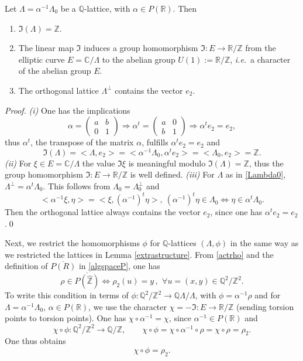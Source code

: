 \documentclass[graybox, envcountsect%
]{svmult}
\def\C{{\mathbb C}}
\def\Q{{\mathbb Q}}
\def\R{{\mathbb R}}
\def\Z{{\mathbb Z}}
\def\qqq{\,,\,~\forall}
\newcommand{\ie}{{\it i.e.\/}\ }
\begin{document}
 
\begin{lemma}\label{extrastructure} Let $\Lambda=\alpha^{-1}\Lambda_0$ be a $\Q$-lattice, with $\alpha\in P(\R)$. Then
 \begin{enumerate}
\item[(i)] $\Im(\Lambda)=\Z$. 
\item[(ii)] The linear map $\Im$ induces a group homomorphism $\Im:E\to \R/\Z$ from the elliptic curve 
$E=\C/\Lambda$ to the abelian group $U(1):=\R/\Z$, \ie a character  of the abelian group $E$.
\item[(iii)] The orthogonal lattice $\Lambda^\perp$ contains the vector $e_2$.
\end{enumerate}
\end{lemma}
\begin{proof} {\it (i)} One has the implications
$$
\alpha=\begin{pmatrix} a &b \\
0 &1 \end{pmatrix}\Rightarrow \alpha^t=\begin{pmatrix} a &0 \\
b &1 \end{pmatrix}\Rightarrow \alpha^t e_2=e_2,
$$
 thus $\alpha^t$, the transpose of the matrix $\alpha$, fulfills $\alpha^t e_2=e_2$ and
$$
\Im(\Lambda)=<\Lambda,e_2>=<\alpha^{-1}\Lambda_0,\alpha^t e_2>=<\Lambda_0,e_2>=\Z.
$$
{\it (ii)} For $\xi\in E=\C/\Lambda$ the value $\Im \xi$ is meaningful modulo $\Im(\Lambda)=\Z$, thus the group homomorphism $\Im:E\to \R/\Z$ is well defined. 
\newline
{\it (iii)} For $\Lambda$  as in \eqref{Lambda0},   $\Lambda^\perp=\alpha^{t}\Lambda_0$. This follows from $\Lambda_0=\Lambda_0^\perp$ and 
$$
<\alpha^{-1}\xi,\eta>=<\xi,(\alpha^{-1})^{t}\eta>, \ (\alpha^{-1})^{t}\eta \in \Lambda_0 \iff 
\eta \in \alpha^{t}\Lambda_0.
$$
Then the orthogonal lattice always contains the vector $e_2$, since one has $\alpha^t e_2=e_2$.\qed
\end{proof}


 Next, we restrict the homomorphisms $\phi$ for $\Q$-lattices $(\Lambda,\phi)$ in the same way as we restricted the lattices  in Lemma \ref{extrastructure}.   From  \eqref{actrho} and the definition of $\overline{P(R)}$  in \eqref{algspaceP}, one has
  \begin{equation}\label{actrhoeq}
\rho \in \overline{P(\hat\Z)} \iff \rho_2(u)=y \qqq u=(x,y)\in \Q^2/\Z^2.
\end{equation}
To write this condition in terms of  $\phi:\Q^2/\Z^2 \to \Q\Lambda / \Lambda$, with $\phi=\alpha^{-1}\rho$ and for $\Lambda=\alpha^{-1}\Lambda_0$,  $\alpha\in P(\R)$, we use the character $\chi=-\Im: E\to \R/\Z$ (sending torsion points to torsion points). One has $\chi \circ \alpha^{-1}=\chi$, since $\alpha^{-1}\in P(\R)$ and 
$$
\chi\circ \phi:\Q^2/\Z^2\to \Q/\Z,   \qquad \chi\circ \phi=\chi \circ \alpha^{-1}\circ \rho=\chi \circ \rho=\rho_2.
$$
One thus obtains
\begin{equation}\label{chiphi}
\chi\circ \phi=\rho_2.
\end{equation}
\end{document}
